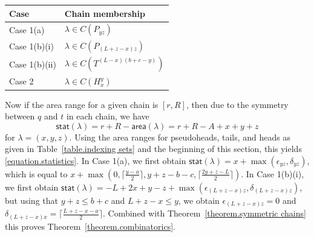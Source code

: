 \documentclass[11pt,reqno]{amsart}
\theoremstyle{definition}
\numberwithin{equation}{section}
\begin{document}
\begin{center}
\begin{tabular}{l|l}
Case & Chain membership\\
\hline
Case 1(a) & $\lambda \in C(P_{yz})$\\
Case 1(b)(i) & $\lambda \in C(P_{(L+z-x)z})$\\
Case 1(b)(ii) & $\lambda \in C(T^{(L-x)(b+c-y)})$\\
Case 2 & $\lambda \in C(H_x^y)$
\end{tabular}
\end{center}
Now if the area range for a given chain is $[r,R]$, then due to the symmetry between $q$ and $t$ in each chain,
we have
\[
	\mathsf{stat}(\lambda) = r + R - \mathsf{area}(\lambda) = r + R -A + x+y+z
\]
for $\lambda=(x,y,z)$. Using the area ranges for pseudoheads, tails, and heads as given in Table~\ref{table.indexing sets}
and the beginning of this section, this yields \eqref{equation.statistics}.
In Case 1(a), we first obtain $\mathsf{stat}(\lambda)=x+\max(\epsilon_{yz},\delta_{yz})$, which is equal to
$x+\max(0,\lceil \frac{y-a}{2} \rceil, y+z-b-c,\lceil \frac{2y+z-L}{2} \rceil)$.
In Case 1(b)(i), we first obtain $\mathsf{stat}(\lambda)=-L+2x+y-z+\max(\epsilon_{(L+z-x)z},\delta_{(L+z-x)z})$,
but using that $y+z\leqslant b+c$ and $L+z-x\leqslant y$, we obtain $\epsilon_{(L+z-x)z}=0$ and 
$\delta_{(L+z-x)x}= \lceil \frac{L+z-x-a}{2} \rceil$. Combined with Theorem~\ref{theorem.symmetric chains}
this proves Theorem~\ref{theorem.combinatorics}.


{}
\end{document}
